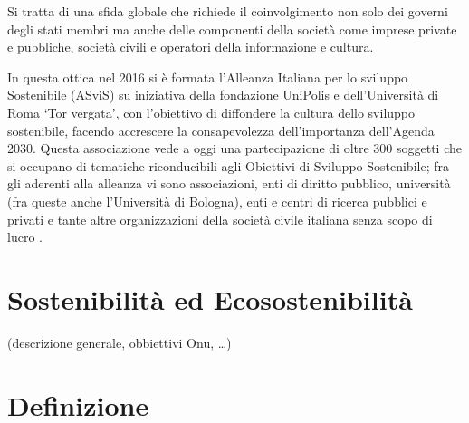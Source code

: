 Si tratta di una sfida globale che richiede il coinvolgimento non solo dei governi degli stati membri ma anche delle componenti della società come imprese private e pubbliche, società civili e operatori della informazione e cultura.

In questa ottica nel 2016 si è formata l'Alleanza Italiana per lo sviluppo Sostenibile (ASviS) \cite{asvis} su iniziativa della fondazione UniPolis e dell'Università di Roma \enquote*{Tor vergata}, con l'obiettivo di diffondere la cultura dello sviluppo sostenibile, facendo accrescere la consapevolezza dell'importanza dell'Agenda 2030.
Questa associazione vede a oggi una partecipazione di oltre 300 soggetti che si occupano di tematiche riconducibili agli Obiettivi di Sviluppo Sostenibile; fra gli aderenti alla alleanza vi sono associazioni, enti di diritto pubblico, università (fra queste anche l'Università di Bologna), enti e centri di ricerca pubblici e privati e tante altre organizzazioni della società civile italiana senza scopo di lucro \cite[Aderenti alla ASviS]{aderenti_asvis}.


%
%
\section{Sostenibilità ed Ecosostenibilità}
(descrizione generale, obbiettivi Onu, …)
\section{Definizione}
%
%
